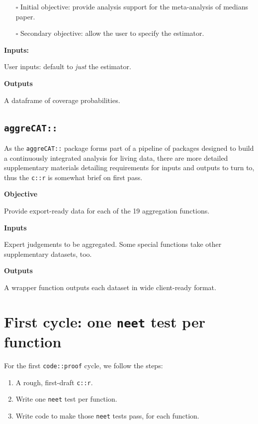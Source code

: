 \documentclass[
]{article}
\providecommand{\tightlist}{%
  \setlength{\itemsep}{0pt}\setlength{\parskip}{0pt}}
\begin{document}
\begin{itemize}
\item[$\square$]
  Initial objective: provide analysis support for the meta-analysis of medians paper.
\item[$\square$]
  Secondary objective: allow the user to specify the estimator.
\end{itemize}

\textbf{Inputs:}

User inputs: default to \emph{just} the estimator.

\textbf{Outputs}

A dataframe of coverage probabilities.

\hypertarget{aggrecat}{%
\subsection{\texorpdfstring{\texttt{aggreCAT::}}{aggreCAT::}}\label{aggrecat}}

As the \texttt{aggreCAT::} package forms part of a pipeline of packages designed to build a continuously integrated analysis for living data, there are more detailed supplementary materials detailing requirements for inputs and outputs to turn to, thus the \texttt{c::r} is somewhat brief on first pass.

\textbf{Objective}

Provide export-ready data for each of the 19 aggregation functions.

\textbf{Inputs}

Expert judgements to be aggregated. Some special functions take other supplementary datasets, too.

\textbf{Outputs}

A wrapper function outputs each dataset in wide client-ready format.

\hypertarget{first-cycle-one-neet-test-per-function}{%
\section{\texorpdfstring{First cycle: one \texttt{neet} test per function}{First cycle: one neet test per function}}\label{first-cycle-one-neet-test-per-function}}

For the first \texttt{code::proof} cycle, we follow the steps:

\begin{enumerate}
\def\labelenumi{\arabic{enumi}.}
\tightlist
\item
  A rough, first-draft \texttt{c::r}.
\item
  Write one \texttt{neet} test per function.
\item
  Write code to make those \texttt{neet} tests pass, for each function.
\end{enumerate}
\end{document}
